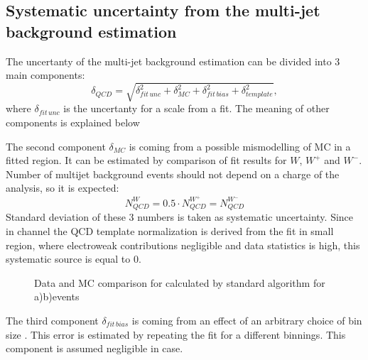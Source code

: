 \subsection{Systematic uncertainty from the multi-jet background estimation }\label{sec:QCDUnc}

The uncertanty of the multi-jet background estimation can be divided into 3 main components:
\begin{equation}
\delta_{QCD} = \sqrt{ \delta_{fit\, unc}^{2}+\delta_{MC}^{2}+\delta_{fit\, bias}^{2}+\delta_{template}^{2}}, 
\end{equation}
where $\delta_{fit\, unc}$ is the uncertanty for a scale from a \chiD fit. The meaning of other components is explained below

The second component $\delta_{MC}$ is coming from a possible mismodelling of MC in a fitted region. It can be estimated by comparison of fit results for $W$, $W^{+}$ and $W^{-}$. Number of multijet background events should not depend on a charge of the analysis, so it is expected:
\begin{equation}
N_{QCD}^{W}=0.5 \cdot N_{QCD}^{W^{+}} =N_{QCD}^{W^{-}}
\end{equation}
Standard deviation of these 3 numbers is taken as systematic uncertainty. Since in \wmunu channel the QCD template normalization is derived from the fit in small \mtw region, where electroweak contributions negligible and data statistics is high, this systematic source is equal to 0.

\begin{figure}[!tbp]
\begin{minipage}[h]{0.49\linewidth}
\end{minipage}
\hfill
\begin{minipage}[h]{0.49\linewidth}
\end{minipage}
\caption{Data and MC comparison for \etmiss calculated by standard \atlas algorithm for a)\wenu b)\wmunu events}
\label{ris:TemplateVar}
\end{figure}

The third component $\delta_{fit\, bias}$ is coming from an effect of an arbitrary choice of bin size . This error is estimated by repeating the fit for a different binnings. This component is assumed negligible in \wmunu case. 

